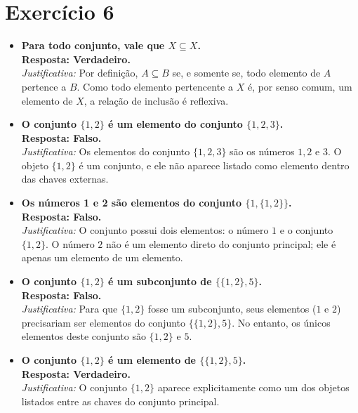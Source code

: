 \documentclass[11pt,reqno,a4paper]{amsart}
\begin{document}
\newpage
\section*{Exercício 6}

\begin{itemize}
    \item \textbf{Para todo conjunto, vale que $X \subseteq X$.} \\
    \textbf{Resposta: Verdadeiro.} \\
    \textit{Justificativa:} Por definição, $A \subseteq B$ se, e somente se, todo elemento de $A$ pertence a $B$. Como todo elemento pertencente a $X$ é, por senso comum, um elemento de $X$, a relação de inclusão é reflexiva.

    \item \textbf{O conjunto $\{1, 2\}$ é um elemento do conjunto $\{1, 2, 3\}$.} \\
    \textbf{Resposta: Falso.} \\
    \textit{Justificativa:} Os elementos do conjunto $\{1, 2, 3\}$ são os números $1, 2$ e $3$. O objeto $\{1, 2\}$ é um conjunto, e ele não aparece listado como elemento dentro das chaves externas.

    \item \textbf{Os números 1 e 2 são elementos do conjunto $\{1, \{1, 2\}\}$.} \\
    \textbf{Resposta: Falso.} \\
    \textit{Justificativa:} O conjunto possui dois elementos: o número $1$ e o conjunto $\{1, 2\}$. O número $2$ não é um elemento direto do conjunto principal; ele é apenas um elemento de um elemento.

    \item \textbf{O conjunto $\{1, 2\}$ é um subconjunto de $\{\{1, 2\}, 5\}$.} \\
    \textbf{Resposta: Falso.} \\ 
    \textit{Justificativa:} Para que $\{1, 2\}$ fosse um subconjunto, seus elementos ($1$ e $2$) precisariam ser elementos do conjunto $\{\{1, 2\}, 5\}$. No entanto, os únicos elementos deste conjunto são $\{1, 2\}$ e $5$.

    \item \textbf{O conjunto $\{1, 2\}$ é um elemento de $\{\{1, 2\}, 5\}$.} \\
    \textbf{Resposta: Verdadeiro.} \\
    \textit{Justificativa:} O conjunto $\{1, 2\}$ aparece explicitamente como um dos objetos listados entre as chaves do conjunto principal.
\end{itemize}
\end{document}

